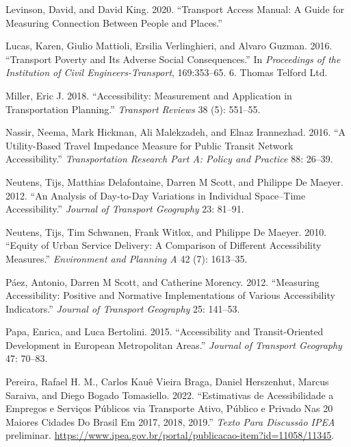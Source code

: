 \documentclass[
  letterpaper,
  DIV=11,
  numbers=noendperiod]{scrreprt}
\newlength{\cslhangindent}
\newlength{\cslentryspacingunit} %
\newenvironment{CSLReferences}[2] %
 {%
  \setlength{\parindent}{0pt}
  \ifodd #1
  \let\oldpar\par
  \def\par{\hangindent=\cslhangindent\oldpar}
  \fi
  \setlength{\parskip}{#2\cslentryspacingunit}
 }%
 {}
\begin{document}
\begin{CSLReferences}{1}{0}
\leavevmode{}%
Levinson, David, and David King. 2020. {``Transport Access Manual: A
Guide for Measuring Connection Between People and Places.''}

\leavevmode{}%
Lucas, Karen, Giulio Mattioli, Ersilia Verlinghieri, and Alvaro Guzman.
2016. {``Transport Poverty and Its Adverse Social Consequences.''} In
\emph{Proceedings of the Institution of Civil Engineers-Transport},
169:353--65. 6. Thomas Telford Ltd.

\leavevmode{}%
Miller, Eric J. 2018. {``Accessibility: Measurement and Application in
Transportation Planning.''} \emph{Transport Reviews} 38 (5): 551--55.

\leavevmode{}%
Nassir, Neema, Mark Hickman, Ali Malekzadeh, and Elnaz Irannezhad. 2016.
{``A Utility-Based Travel Impedance Measure for Public Transit Network
Accessibility.''} \emph{Transportation Research Part A: Policy and
Practice} 88: 26--39.

\leavevmode{}%
Neutens, Tijs, Matthias Delafontaine, Darren M Scott, and Philippe De
Maeyer. 2012. {``An Analysis of Day-to-Day Variations in Individual
Space--Time Accessibility.''} \emph{Journal of Transport Geography} 23:
81--91.

\leavevmode{}%
Neutens, Tijs, Tim Schwanen, Frank Witlox, and Philippe De Maeyer. 2010.
{``Equity of Urban Service Delivery: A Comparison of Different
Accessibility Measures.''} \emph{Environment and Planning A} 42 (7):
1613--35.

\leavevmode{}%
Páez, Antonio, Darren M Scott, and Catherine Morency. 2012. {``Measuring
Accessibility: Positive and Normative Implementations of Various
Accessibility Indicators.''} \emph{Journal of Transport Geography} 25:
141--53.

\leavevmode{}%
Papa, Enrica, and Luca Bertolini. 2015. {``Accessibility and
Transit-Oriented Development in European Metropolitan Areas.''}
\emph{Journal of Transport Geography} 47: 70--83.

\leavevmode{}%
Pereira, Rafael H. M., Carlos Kauê Vieira Braga, Daniel Herszenhut,
Marcus Saraiva, and Diego Bogado Tomasiello. 2022. {``Estimativas de
Acessibilidade a Empregos e Serviços Públicos via Transporte Ativo,
Público e Privado Nas 20 Maiores Cidades Do Brasil Em 2017, 2018,
2019.''} \emph{Texto Para Discuss{ã}o IPEA} preliminar.
\url{https://www.ipea.gov.br/portal/publicacao-item?id=11058/11345}.


\end{CSLReferences}
\end{document}
